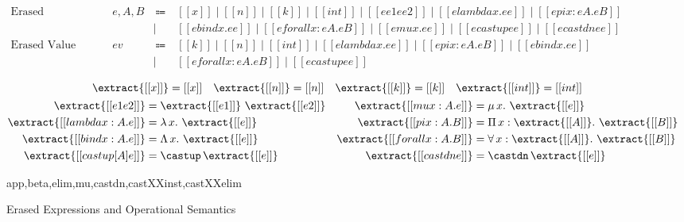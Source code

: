 \begin{figure}
  \label{fig:extraction}
  \centering
  \begin{equation*}
  \begin{array}{llcl}
      \text{Erased Expressions} & e, A, B & ~ \Coloneqq ~ & [[x]] \mid [[n]] \mid [[k]] \mid [[int]] \mid [[ee1 ee2]] \mid [[elambda x. ee]] \mid [[epi x : eA. eB]] \\
      & & \mid & [[ebind x. ee]] \mid [[eforall x : eA. eB]] \mid [[emu x. ee]] \mid [[ecastup ee]] \mid [[ecastdn ee]] \\
      \text{Erased Value} & ev & ~ \Coloneqq ~ & [[k]] \mid [[n]] \mid [[int]] \mid [[elambda x. ee]] \mid [[epi x : eA. eB]] \mid [[ebind x. ee]] \\
      & & \mid & [[eforall x : eA. eB]] \mid [[ecastup ee]]
  \end{array}
  \end{equation*}

  \begin{gather*}
    \begin{align*}
    \extract{[[x]]} &= [[x]] &
    \extract{[[n]]} &= [[n]] &
    \extract{[[k]]} &= [[k]] &
    \extract{[[int]]} &= [[int]]
    \end{align*} \\
    \begin{align*}
     \extract{[[e1 e2]]} &= \extract{[[e1]]} ~ \extract{[[e2]]} & %
      \extract{[[mu x : A. e]]} &= \mu \, x. ~ \extract{[[e]]} \\
     \extract{[[lambda x : A. e]]} &= \lambda \, x. ~ \extract{[[e]]} & %
      \extract{[[pi x : A. B]]} &= \Pi \, x : \extract{[[A]]}. ~ \extract{[[B]]} \\
     \extract{[[bind x : A. e]]} &= \Lambda \, x. ~ \extract{[[e]]} & %
      \extract{[[forall x : A. B]]} &= \forall \, x : \extract{[[A]]}. ~ \extract{[[B]]} \\
     \extract{[[castup [A] e]]} &= \castup \, \extract{[[e]]} & %
      \extract{[[castdn e]]} &= \castdn \, \extract{[[e]]}
    \end{align*}
  \end{gather*}

    {app,beta,elim,mu,castdn,castXXinst,castXXelim}
  \caption{Erased Expressions and Operational Semantics}
\end{figure}

